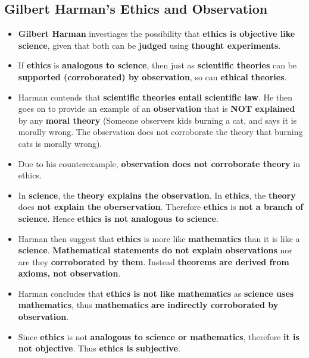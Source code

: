 \documentclass{article}
\begin{document}
    \subsection*{Gilbert Harman's Ethics and Observation}
    \begin{itemize}
        \item \textbf{Gilbert Harman} investiages the possibility that \textbf{ethics is objective like science}, given that both can be \textbf{judged} using \textbf{thought experiments}.
        \item If \textbf{ethics} is \textbf{analogous to science}, then just as \textbf{scientific theories} can be \textbf{supported (corroborated) by observation}, so can \textbf{ethical theories}.
        \item Harman contends that \textbf{scientific theories entail scientific law}. He then goes on to provide an example of an \textbf{observation} that is \textbf{NOT explained} by any \textbf{moral theory} (Someone observers kids burning a cat, and says it is morally wrong. The observation does not corroborate the theory that burning cats is morally wrong).
        \item Due to his counterexample, \textbf{observation does not corroborate theory} in ethics.
        \item In \textbf{science}, the \textbf{theory explains the observation}. In \textbf{ethics}, the \textbf{theory} does \textbf{not explain the oberservation}. Therefore \textbf{ethics} is \textbf{not a branch of science}. Hence \textbf{ethics is not analogous to science}.
        \item Harman then suggest that \textbf{ethics} is more like \textbf{mathematics} than it is like a \textbf{science}. \textbf{Mathematical statements do not explain observations} nor are they \textbf{corroborated by them}. Instead \textbf{theorems are derived from axioms, not observation}.
        \item Harman concludes that \textbf{ethics is not like mathematics} as \textbf{science uses mathematics}, thus \textbf{mathematics are indirectly corroborated by observation}.
        \item Since \textbf{ethics} is not \textbf{analogous to science or mathematics}, therefore \textbf{it is not objective}. Thus \textbf{ethics is subjective}.
    \end{itemize}
\end{document}
